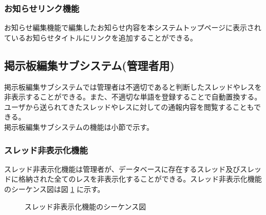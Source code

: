 \documentclass[a4j]{jarticle}
\begin{document}
  \subsubsection{お知らせリンク機能}
  お知らせ編集機能で編集したお知らせ内容を本システムトップページに表示されているお知らせタイトルにリンクを追加することができる。
  \subsection{掲示板編集サブシステム(管理者用)}
  掲示板編集サブシステムでは管理者は不適切であると判断したスレッドやレスを非表示することができる。また、不適切な単語を登録することで自動置換する。ユーザから送られてきたスレッドやレスに対しての通報内容を閲覧することもできる。\\
  掲示板編集サブシステムの機能は小節で示す。
  \subsubsection{スレッド非表示化機能}
  スレッド非表示化機能は管理者が、データベースに存在するスレッド及びスレッドに格納された全てのレスを非表示化することができる。スレッド非表示化機能のシーケンス図は図 \ref{fig:admin_bbs_thread-hide.png} に示す。
  \begin{figure}[H]
    \centering
    \caption{スレッド非表示化機能のシーケンス図}
    \label{fig:admin_bbs_thread-hide.png}
  \end{figure}
\end{document}
